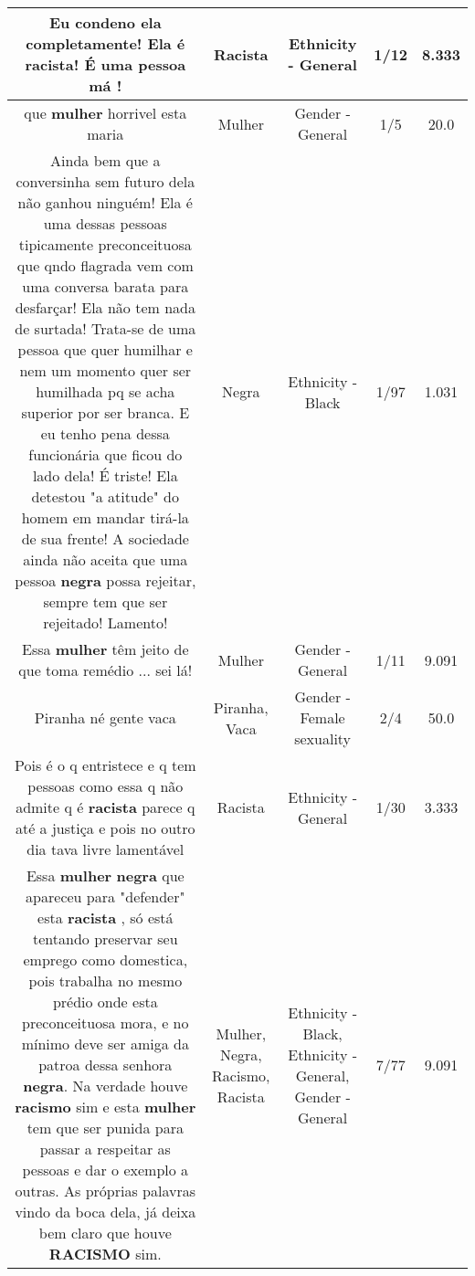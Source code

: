 \documentclass[11pt]{article}
\newlength\mylength
\begin{document}
\begin{center}
\begin{longtable}{|C{.65\mylength}|C{.30\mylength}|C{.12\mylength}|C{.12\mylength}|C{.12\mylength}|}
  \small Eu condeno ela completamente! Ela é \textbf{racista}! É uma pessoa má !\normalsize   & Racista & Ethnicity - General & 1/12 & 8.333 \\  \hline
  \small que \textbf{mulher} horrivel esta maria\normalsize   & Mulher & Gender - General & 1/5 & 20.0 \\  \hline
  \small Ainda bem que a conversinha sem futuro dela não ganhou ninguém! Ela é uma dessas pessoas tipicamente preconceituosa que qndo flagrada vem com uma conversa barata para desfarçar! Ela não tem nada de surtada! Trata-se de uma pessoa que quer humilhar e nem um momento quer ser humilhada pq se acha superior por ser branca. E eu tenho pena dessa funcionária que ficou do lado dela! É triste! Ela detestou "a atitude" do homem em mandar tirá-la de sua frente! A sociedade ainda não aceita que uma pessoa \textbf{negra} possa rejeitar, sempre tem que ser rejeitado! Lamento!\normalsize   & Negra & Ethnicity - Black & 1/97 & 1.031 \\  \hline
  \small Essa \textbf{mulher} têm jeito de que toma remédio  ... sei lá!\normalsize   & Mulher & Gender - General & 1/11 & 9.091 \\  \hline
  \small Piranha né gente vaca\normalsize   & Piranha, Vaca & Gender - Female sexuality & 2/4 & 50.0 \\  \hline
  \small Pois é o q entristece e q tem pessoas como essa q não admite q é \textbf{racista} parece q até a justiça e pois no outro dia tava livre lamentável\normalsize   & Racista & Ethnicity - General & 1/30 & 3.333 \\  \hline
  \small Essa \textbf{mulher} \textbf{negra} que apareceu para "defender" esta \textbf{racista} , só está tentando  preservar seu emprego como domestica,  pois trabalha no mesmo prédio onde esta preconceituosa mora,  e no mínimo deve ser amiga da patroa dessa senhora \textbf{negra}.  Na verdade houve \textbf{racismo} sim e esta \textbf{mulher} tem que ser punida para passar a respeitar as pessoas e dar o exemplo a outras.    As próprias palavras vindo da boca dela,  já deixa bem claro que houve \textbf{RACISMO}  sim.\normalsize   & Mulher, Negra, Racismo, Racista & Ethnicity - Black, Ethnicity - General, Gender - General & 7/77 & 9.091 \\  \hline

\end{longtable}
\end{center}
\end{document}

